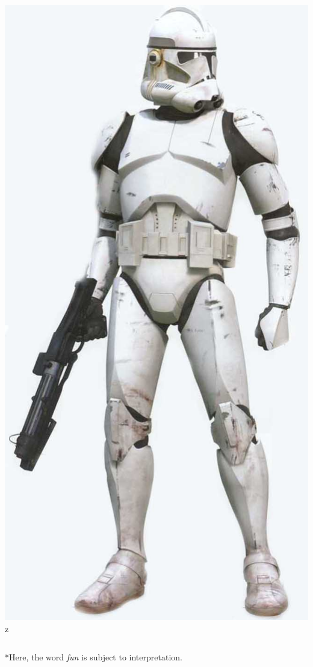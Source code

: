 \documentclass{beamer}
\begin{document}
\begin{frame}
\begin{columns}
\includegraphics[width=\textwidth]{clone.jpg}z
\end{columns}

*Here, the word \textit{fun} is subject to interpretation.
\end{frame}
\end{document}
